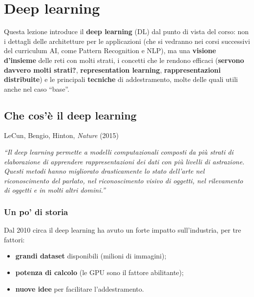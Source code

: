 \chapter{Deep learning}\label{ch-17}

Questa lezione introduce il \textbf{deep learning} (DL) dal punto di
vista del corso: non i dettagli delle architetture per le applicazioni
(che si vedranno nei corsi successivi del curriculum AI, come Pattern
Recognition e NLP), ma una \textbf{visione d'insieme} delle reti con
molti strati, i concetti che le rendono efficaci (\textbf{servono
davvero molti strati?}, \textbf{representation learning},
\textbf{rappresentazioni distribuite}) e le principali \textbf{tecniche}
di addestramento, molte delle quali utili anche nel caso ``base''.

\section{Che cos'è il deep learning}\label{che-cosuxe8-il-deep-learning}

\begin{boxnote}{LeCun, Bengio, Hinton, \emph{Nature} (2015)}

\emph{``Il deep learning permette a modelli computazionali composti da
più strati di elaborazione di apprendere rappresentazioni dei dati con
più livelli di astrazione. Questi metodi hanno migliorato drasticamente
lo stato dell'arte nel riconoscimento del parlato, nel riconoscimento
visivo di oggetti, nel rilevamento di oggetti e in molti altri
domini.''}

\end{boxnote}

\subsection{Un po' di storia}\label{un-po-di-storia}

Dal 2010 circa il deep learning ha avuto un forte impatto
sull'industria, per tre fattori:

\begin{itemize}
\tightlist
\item
  \textbf{grandi dataset} disponibili (milioni di immagini);
\item
  \textbf{potenza di calcolo} (le GPU sono il fattore abilitante);
\item
  \textbf{nuove idee} per facilitare l'addestramento.
\end{itemize}

